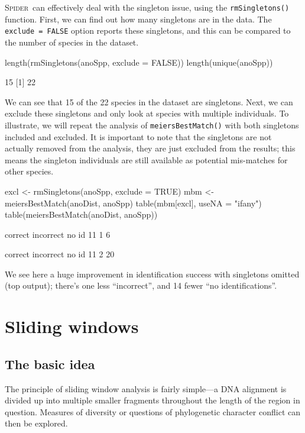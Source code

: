 \documentclass{article}
\newcommand{\spider}{\textsc{Spider}~} %
\newcommand{\fun}[1]{\texttt{#1}}
\begin{document}
\spider can effectively deal with the singleton issue, using the \fun{rmSingletons()} function. First, we can find out how many singletons are in the data. The \fun{exclude = FALSE} option reports these singletons, and this can be compared to the number of species in the dataset.

\begin{console}
length(rmSingletons(anoSpp, exclude = FALSE))
length(unique(anoSpp))
\end{console}


\begin{Routput}
[1] 15
[1] 22
\end{Routput}


We can see that 15 of the 22 species in the dataset are singletons. Next, we can exclude these singletons and only look at species with multiple individuals. To illustrate, we will repeat the analysis of \fun{meiersBestMatch()} with both singletons included and excluded. It is important to note that the singletons are not actually removed from the analysis, they are just excluded from the results; this means the singleton individuals are still available as potential mis-matches for other species.

\begin{console}
excl <- rmSingletons(anoSpp, exclude = TRUE)
mbm <- meiersBestMatch(anoDist, anoSpp)
table(mbm[excl], useNA = "ifany")
table(meiersBestMatch(anoDist, anoSpp))
\end{console}

\begin{Routput}
  correct incorrect     no id 
       11         1         6 

  correct incorrect     no id 
       11         2        20 
\end{Routput}

We see here a huge improvement in identification success with singletons omitted (top output); there's one less ``incorrect'', and 14 fewer ``no identifications''.



\section{Sliding windows} 

\subsection{The basic idea}
The principle of sliding window analysis is fairly simple---a DNA alignment is divided up into multiple smaller fragments throughout the length of the region in question. Measures of diversity \citep{Roe.Sper.2007} or questions of phylogenetic character conflict \citep{Crui.2011} can then be explored.
\end{document}
